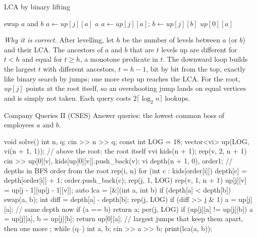 \begin{pseudo}{LCA by binary lifting}
\begin{algorithmic}[1]
 \State swap $a$ and $b$ \EndIf
{} 
   \State $a \gets \mathit{up}[j][a]$ \EndIf
\EndFor
{} \State \Return $a$ \EndIf
{}
   \State $a \gets \mathit{up}[j][a]$; $b \gets \mathit{up}[j][b]$ \EndIf
\EndFor
\State \Return $\mathit{up}[0][a]$
\end{algorithmic}
\end{pseudo}

\emph{Why it is correct.} After levelling, let $h$ be the number of levels between $a$ (or $b$) and their LCA. The ancestors of $a$
and $b$ that are $t$ levels up are different for $t < h$ and equal for $t \ge h$, a monotone predicate in $t$. The downward loop
builds the largest $t$ with different ancestors, $t = h - 1$, bit by bit from the top, exactly like binary search by jumps; one more
step up reaches the LCA. For the root, $\mathit{up}[j]$ points at the root itself, so an overshooting jump lands on equal vertices
and is simply not taken. Each query costs $2\lceil \log_2 n\rceil$ lookups.

\begin{problem}{Company Queries II (CSES)}
Answer queries: the lowest common boss of employees $a$ and $b$.
\end{problem}

\begin{code}
void solve() {
    int n, q;
    cin >> n >> q;
    const int LOG = 18;
    vector<vi> up(LOG, vi(n + 1, 1));  // above the root: the root itself
    vvi kids(n + 1);
    rep(v, 2, n + 1) cin >> up[0][v], kids[up[0][v]].push_back(v);
    vi depth(n + 1, 0), order{1};  // depths in BFS order from the root
    rep(i, n) for (int c : kids[order[i]]) {
        depth[c] = depth[order[i]] + 1;
        order.push_back(c);
    }
    rep(j, 1, LOG) rep(v, 1, n + 1) up[j][v] = up[j - 1][up[j - 1][v]];
    auto lca = [&](int a, int b) {
        if (depth[a] < depth[b]) swap(a, b);
        int diff = depth[a] - depth[b];
        rep(j, LOG) if (diff >> j & 1) a = up[j][a];  // same depth now
        if (a == b) return a;
        per(j, LOG) if (up[j][a] != up[j][b]) a = up[j][a], b = up[j][b];
        return up[0][a];  // largest jumps that keep them apart, then one more
    };
    while (q--) {
        int a, b;
        cin >> a >> b;
        print(lca(a, b));
    }
}
\end{code}

